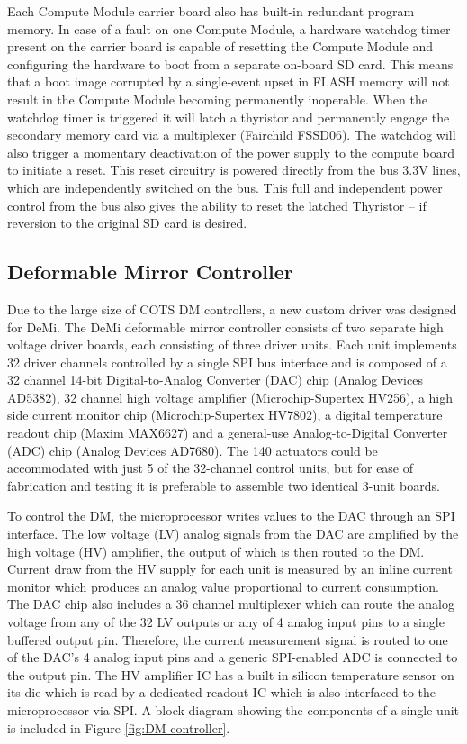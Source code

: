 \documentclass[]{spie}  %
\begin{document}
Each Compute Module carrier board also has built-in redundant program memory. In case of a fault on one Compute Module, a hardware watchdog timer present on the carrier board is capable of resetting the Compute Module and configuring the hardware to boot from a separate on-board SD card. This means that a boot image corrupted by a single-event upset in FLASH memory will not result in the Compute Module becoming permanently inoperable.  When the watchdog timer is triggered it will latch a thyristor and permanently engage the secondary memory card via a multiplexer (Fairchild FSSD06). The watchdog will also trigger a momentary deactivation of the power supply to the compute board to initiate a reset.  This reset circuitry is powered directly from the bus 3.3V lines, which are independently switched on the bus. This full and independent power control from the bus also gives the ability to reset the latched Thyristor -- if reversion to the original SD card is desired.  

\subsection{Deformable Mirror Controller}%
Due to the large size of \gls{COTS} \gls{DM} controllers, a new custom driver was designed for DeMi. 
The DeMi deformable mirror controller consists of two separate high voltage driver boards, each consisting of three driver units. Each unit implements 32 driver channels controlled by a single SPI bus interface and is composed of a 32 channel 14-bit Digital-to-Analog Converter (DAC) chip (Analog Devices AD5382), 32 channel high voltage amplifier (Microchip-Supertex HV256), a high side current monitor chip (Microchip-Supertex HV7802), a digital temperature readout chip (Maxim MAX6627) and a general-use Analog-to-Digital Converter (ADC) chip (Analog Devices AD7680). The 140 actuators could be accommodated with just 5 of the 32-channel control units, but for ease of fabrication and testing it is preferable to assemble two identical 3-unit boards.

To control the DM, the microprocessor writes values to the DAC through an SPI interface. The low voltage (LV) analog signals from the DAC are amplified by the high voltage (HV) amplifier, the output of which is then routed to the DM. Current draw from the HV supply for each unit is measured by an inline current monitor which produces an analog value proportional to current consumption. The DAC chip also includes a 36 channel multiplexer which can route the analog voltage from any of the 32 LV outputs or any of 4 analog input pins to a single buffered output pin. Therefore, the current measurement signal is routed to one of the DAC's 4 analog input pins and a generic SPI-enabled ADC is connected to the output pin. The HV amplifier IC has a built in silicon temperature sensor on its die which is read by a dedicated readout IC which is also interfaced to the microprocessor via SPI. A block diagram showing the components of a single unit is included in Figure \ref{fig:DM controller}.
\end{document}
